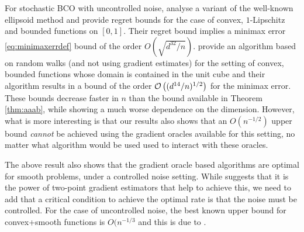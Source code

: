 For stochastic BCO with uncontrolled noise, \cite{AgFoHsuKaRa13:SIAM} analyse a variant of the well-known ellipsoid method and provide regret bounds for the case of convex, $1$-Lipschitz and bounded functions on $[0,1]$. Their regret bound implies a minimax error \eqref{eq:minimaxerrdef} bound of the order  $O\left(\sqrt{d^{32}/n}\right)$.
\cite{liang2014zeroth} provide an algorithm based on random walks (and not using gradient estimates) for the setting of convex, bounded functions whose domain is contained in the unit cube and their algorithm results in a bound of the order $\mathcal{O}\left((d^{14}/n)^{1/2}\right)$ for the minimax error.
These bounds decrease faster in $n$ than the bound available in Theorem \ref{thm:aaab}, while showing a much worse dependence on the dimension.
However, what is more interesting is that our results also shows that an $O(n^{-1/2})$ upper bound \emph{cannot} be achieved using the gradient oracles available for this setting, no matter what algorithm would be used used to interact with these oracles.

The above result also shows that the gradient oracle based algorithms are optimal for smooth problems, under a controlled noise setting.
While \cite{duchi2015optimal} suggests that it is the power of two-point gradient estimators that help to achieve this, we need to add that a critical condition to achieve the optimal rate is that the noise must be controlled. For the case of uncontrolled noise, the best known upper bound for convex+smooth functions is $O(n^{-1/3}$ and this is due to \cite{saha2011improved}.


